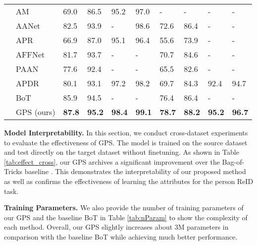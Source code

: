 \documentclass[final]{cvpr}
\begin{document}
\begin{table*}[!t]
\begin{center}
\begin{tabular}{p{2.5cm}| p{2.6cm} |p{0.7cm} |p{0.7cm} |p{0.7cm} |p{0.8cm}|p{0.7cm} |p{0.7cm} |p{0.7cm} |p{0.8cm}}
                                        &AM \cite{a3m}              &69.0	&86.5	&95.2	&97.0   &-      &-      &-      &-          \\
                                        &AANet \cite{aanet}             &82.5	&93.9	&-	    &98.6   &72.6	&86.4	&-      &-          \\
                                        &APR \cite{attreid}             &66.9	&87.0	&95.1	&96.4   &55.6	&73.9	&-      &-          \\ &AFFNet \cite{affnet}           &81.7   &93.7   &-      &-      &70.7   &84.6   &-      &-          \\
                                        &PAAN \cite{PAAN}               &77.6   &92.4   &-      &-      &65.5   &82.6   &-      &-          \\
                                        &APDR \cite{apdr}               &80.1	&93.1	&97.2	&98.2   &69.7	&84.3	&92.4	&94.7       \\
&BoT \cite{BoT}                 &85.9   &94.5   &-      &-      &76.4	&86.4   &-      &-          \\


                                        &GPS (ours)                  &\cellcolor[HTML]{B8F0E1}\textbf{87.8} &\cellcolor[HTML]{B8F0E1}\textbf{95.2} &\cellcolor[HTML]{B8F0E1}\textbf{98.4}  &\cellcolor[HTML]{B8F0E1}\textbf{99.1}  &\cellcolor[HTML]{B8F0E1}\textbf{78.7}  &\cellcolor[HTML]{B8F0E1}\textbf{88.2}  &\cellcolor[HTML]{B8F0E1}\textbf{95.2}  &\cellcolor[HTML]{B8F0E1}\textbf{96.7}\\
			
            \hline
		\end{tabular}
	\end{center}
	\label{tab:sota}
\end{table*}

\textbf{Model Interpretability.} In this section, we conduct cross-dataset experiments to evaluate the effectiveness of GPS. The model is trained on the source dataset and test directly on the target dataset without finetuning. As shown in Table \ref{tab:effect_cross}, our GPS archives a significant improvement over the Bag-of-Tricks baseline \cite{BoT}. This demonstrates the interpretability of our proposed method as well as confirms the effectiveness of learning the attributes for the person ReID task.

\textbf{Training Parameters.} We also provide the number of training parameters of our GPS and the baseline BoT \cite{BoT} in Table \ref{tab:nParam} to show the complexity of each method. Overall, our GPS slightly increases about 3M parameters in comparison with the baseline BoT while achieving much better performance.
\end{document}
